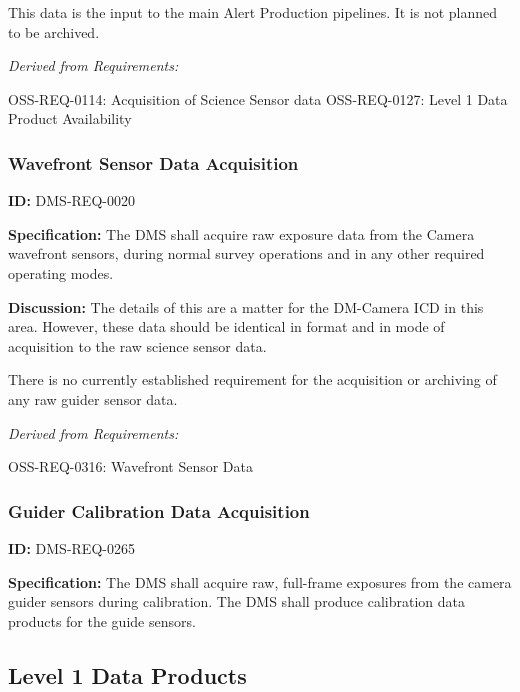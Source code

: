 \documentclass[SE,toc,lsstdraft]{lsstdoc}
\begin{document}
This data is the input to the main Alert Production pipelines.  It is not planned to be archived.




\emph{Derived from Requirements:}

OSS-REQ-0114:
Acquisition of Science Sensor data \newline
OSS-REQ-0127:
Level 1 Data Product Availability \newline


\subsubsection{Wavefront Sensor Data Acquisition}

\label{DMS-REQ-0020}
\textbf{ID:} DMS-REQ-0020

\textbf{Specification:} The DMS shall acquire raw exposure data from the Camera wavefront sensors, during normal survey operations and in any other required operating modes.

\textbf{Discussion:} The details of this are a matter for the DM-Camera ICD in this area. However, these data should be identical in format and in mode of acquisition to the raw science sensor data.

There is no currently established requirement for the acquisition or archiving of any raw guider sensor data.




\emph{Derived from Requirements:}

OSS-REQ-0316:
Wavefront Sensor Data \newline


\subsubsection{Guider Calibration Data Acquisition}

\label{DMS-REQ-0265}
\textbf{ID:} DMS-REQ-0265

\textbf{Specification:} The DMS shall acquire raw, full-frame exposures from the camera guider sensors during calibration. The DMS shall produce calibration data products for the guide sensors.






\subsection{Level 1 Data Products}
\end{document}
